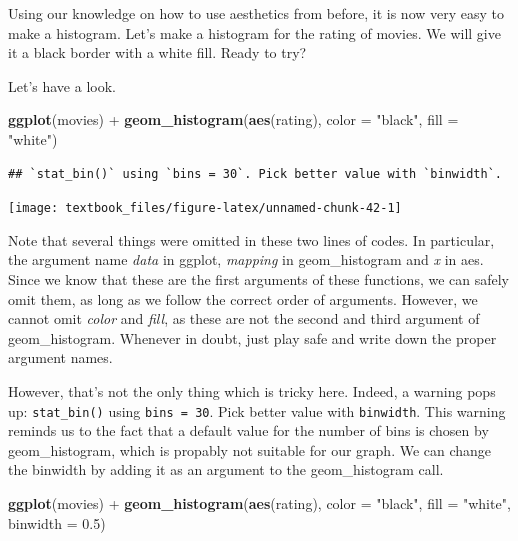 \documentclass[]{tufte-book}
\newenvironment{Shaded}{}{}
\newcommand{\DataTypeTok}[1]{\textcolor[rgb]{0.56,0.13,0.00}{#1}}
\newcommand{\FloatTok}[1]{\textcolor[rgb]{0.25,0.63,0.44}{#1}}
\newcommand{\KeywordTok}[1]{\textcolor[rgb]{0.00,0.44,0.13}{\textbf{#1}}}
\newcommand{\NormalTok}[1]{#1}
\newcommand{\OperatorTok}[1]{\textcolor[rgb]{0.40,0.40,0.40}{#1}}
\newcommand{\StringTok}[1]{\textcolor[rgb]{0.25,0.44,0.63}{#1}}
\begin{document}
Using our knowledge on how to use aesthetics from before, it is now very easy to make a histogram. Let's make a histogram for the rating of movies. We will give it a black border with a white fill. Ready to try?

Let's have a look.

\begin{Shaded}
\begin{Highlighting}[]
\KeywordTok{ggplot}\NormalTok{(movies) }\OperatorTok{+}
\StringTok{    }\KeywordTok{geom_histogram}\NormalTok{(}\KeywordTok{aes}\NormalTok{(rating), }\DataTypeTok{color =} \StringTok{"black"}\NormalTok{, }\DataTypeTok{fill =} \StringTok{"white"}\NormalTok{)}
\end{Highlighting}
\end{Shaded}

\begin{verbatim}
## `stat_bin()` using `bins = 30`. Pick better value with `binwidth`.
\end{verbatim}

\texttt{[image: textbook\_files/figure-latex/unnamed-chunk-42-1]}

Note that several things were omitted in these two lines of codes. In particular, the argument name \emph{data} in ggplot, \emph{mapping} in geom\_histogram and \emph{x} in aes. Since we know that these are the first arguments of these functions, we can safely omit them, as long as we follow the correct order of arguments. However, we cannot omit \emph{color} and \emph{fill}, as these are not the second and third argument of geom\_histogram. Whenever in doubt, just play safe and write down the proper argument names.

However, that's not the only thing which is tricky here. Indeed, a warning pops up: \texttt{stat\_bin()} using \texttt{bins\ =\ 30}. Pick better value with \texttt{binwidth}. This warning reminds us to the fact that a default value for the number of bins is chosen by geom\_histogram, which is propably not suitable for our graph. We can change the binwidth by adding it as an argument to the geom\_histogram call.

\begin{Shaded}
\begin{Highlighting}[]
\KeywordTok{ggplot}\NormalTok{(movies) }\OperatorTok{+}
\StringTok{    }\KeywordTok{geom_histogram}\NormalTok{(}\KeywordTok{aes}\NormalTok{(rating), }\DataTypeTok{color =} \StringTok{"black"}\NormalTok{, }\DataTypeTok{fill =} \StringTok{"white"}\NormalTok{, }\DataTypeTok{binwidth =} \FloatTok{0.5}\NormalTok{)}
\end{Highlighting}
\end{Shaded}
\end{document}
